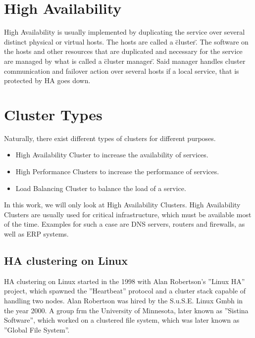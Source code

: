 \section{High Availability}


High Availability is usually implemented by duplicating the service over several distinct physical or
virtual hosts. The hosts are called a \"cluster\". The software on the hosts and other resources
that are duplicated and necessary for the service are managed by what is called a \"cluster manager\".
Said manager handles cluster communication and failover action over several hosts if a local service,
that is protected by \ac{HA} goes down.

\section{Cluster Types}

Naturally, there exist different types of clusters for different purposes.
\begin{itemize}
\item High Availability Cluster to increase the availability of services.
\item High Performance Clusters to increase the performance of services.
\item Load Balancing Cluster to balance the load of a service.
\end{itemize}

In this work, we will only look at High Availability Clusters.
High Availability Clusters are usually used for critical infrastructure,
which must be available most of the time. Examples for such a case are DNS servers,
routers and firewalls, as well as \ac{ERP} systems.

\subsection{\ac{HA} clustering on Linux}

\ac{HA} clustering on Linux started in the 1998  with Alan Robertson's ''Linux HA'' project,
which spawned the ''Heartbeat'' protocol and a cluster stack capable of handling two nodes.
Alan Robertson was hired by the S.u.S.E. Linux Gmbh in the year 2000.
A group frm the University of Minnesota, later known as ''Sistina Software'', which worked
on a clustered file system, which was later known as ''Global File System''.



